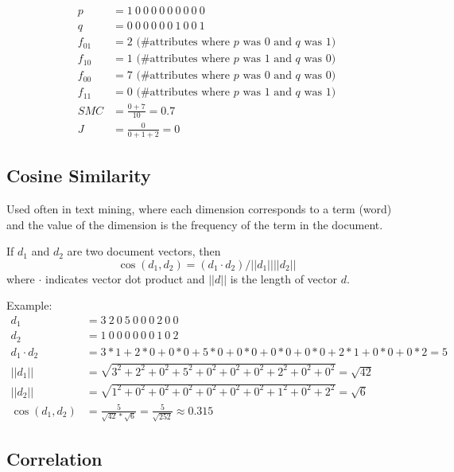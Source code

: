 \begin{align*}
	p &= 1\ 0\ 0\ 0\ 0\ 0\ 0\ 0\ 0\ 0\\
	q &= 0\ 0\ 0\ 0\ 0\ 0\ 1\ 0\ 0\ 1\\
	f_{01} &= 2 \text{ (\#attributes where } p \text{ was 0 and } q \text{ was 1)}\\
	f_{10} &= 1 \text{ (\#attributes where } p \text{ was 1 and } q \text{ was 0)}\\
	f_{00} &= 7 \text{ (\#attributes where } p \text{ was 0 and } q \text{ was 0)}\\
	f_{11} &= 0 \text{ (\#attributes where } p \text{ was 1 and } q \text{ was 1)}\\
	SMC &= \frac{0 + 7}{10} = 0.7\\
	J &= \frac{0}{0 + 1 + 2} = 0
\end{align*}

\subsection{Cosine Similarity}
Used often in text mining, where each dimension corresponds to a term (word) and the value
of the dimension is the frequency of the term in the document.

If $d_1$ and $d_2$ are two document vectors, then
\[
	\cos( d_1, d_2 ) = (d_1 \cdot d_2) / ||d_1|| ||d_2||
\]
where $\cdot$ indicates vector dot product and $||d||$ is the length of vector $d$.

Example:
\begin{align*}
	d_1 &= 3\ 2\ 0\ 5\ 0\ 0\ 0\ 2\ 0\ 0\\
	d_2 &= 1\ 0\ 0\ 0\ 0\ 0\ 0\ 1\ 0\ 2\\
	d_1 \cdot d_2 &= 3*1 + 2*0 + 0*0 + 5*0 + 0*0 + 0*0 + 0*0 + 2*1 + 0*0 + 0*2 = 5\\
	||d_1|| &= \sqrt{3^2 + 2^2 + 0^2 + 5^2 + 0^2 + 0^2 + 0^2 + 2^2 + 0^2 + 0^2} = \sqrt{42}\\
	||d_2|| &= \sqrt{1^2 + 0^2 + 0^2 + 0^2 + 0^2 + 0^2 + 0^2 + 1^2 + 0^2 + 2^2} = \sqrt{6}\\
	\cos(d_1, d_2) &= \frac{5}{\sqrt{42} * \sqrt{6}} = \frac{5}{\sqrt{252}} \approx 0.315
\end{align*}


\subsection{Correlation}

